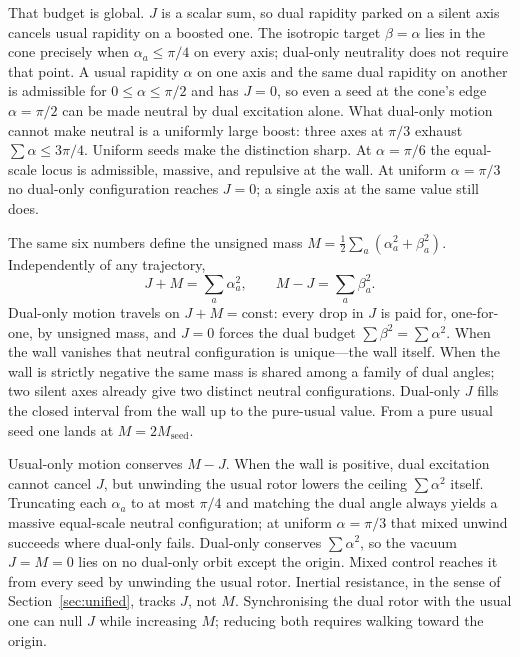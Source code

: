 \documentclass[a4paper]{article}
\begin{document}
That budget is global. $J$ is a scalar sum, so dual rapidity parked on a silent axis cancels usual rapidity on a boosted one. The isotropic target $\beta=\alpha$ lies in the cone precisely when $\alpha_a\le\pi/4$ on every axis; dual-only neutrality does not require that point. A usual rapidity $\alpha$ on one axis and the same dual rapidity on another is admissible for $0\le\alpha\le\pi/2$ and has $J=0$, so even a seed at the cone's edge $\alpha=\pi/2$ can be made neutral by dual excitation alone. What dual-only motion cannot make neutral is a uniformly large boost: three axes at $\pi/3$ exhaust $\sum\alpha\le 3\pi/4$. Uniform seeds make the distinction sharp. At $\alpha=\pi/6$ the equal-scale locus is admissible, massive, and repulsive at the wall. At uniform $\alpha=\pi/3$ no dual-only configuration reaches $J=0$; a single axis at the same value still does.

The same six numbers define the unsigned mass $M=\tfrac12\sum_a(\alpha_a^2+\beta_a^2)$. Independently of any trajectory,
\[
J+M=\sum_a\alpha_a^2,\qquad M-J=\sum_a\beta_a^2.
\]
Dual-only motion travels on $J+M=\mathrm{const}$: every drop in $J$ is paid for, one-for-one, by unsigned mass, and $J=0$ forces the dual budget $\sum\beta^2=\sum\alpha^2$. When the wall vanishes that neutral configuration is unique---the wall itself. When the wall is strictly negative the same mass is shared among a family of dual angles; two silent axes already give two distinct neutral configurations. Dual-only $J$ fills the closed interval from the wall up to the pure-usual value. From a pure usual seed one lands at $M=2M_{\mathrm{seed}}$.

Usual-only motion conserves $M-J$. When the wall is positive, dual excitation cannot cancel $J$, but unwinding the usual rotor lowers the ceiling $\sum\alpha^2$ itself. Truncating each $\alpha_a$ to at most $\pi/4$ and matching the dual angle always yields a massive equal-scale neutral configuration; at uniform $\alpha=\pi/3$ that mixed unwind succeeds where dual-only fails. Dual-only conserves $\sum\alpha^2$, so the vacuum $J=M=0$ lies on no dual-only orbit except the origin. Mixed control reaches it from every seed by unwinding the usual rotor. Inertial resistance, in the sense of Section~\ref{sec:unified}, tracks $J$, not $M$. Synchronising the dual rotor with the usual one can null $J$ while increasing $M$; reducing both requires walking toward the origin.
\end{document}
